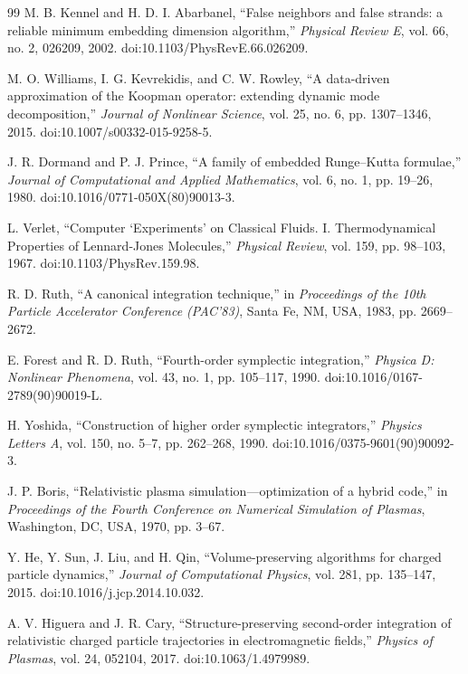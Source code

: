 \documentclass[11pt]{article}
\begin{document}
\begin{thebibliography}{99}
M. B. Kennel and H. D. I. Abarbanel, ``False neighbors and false strands: a reliable minimum embedding dimension algorithm,'' \emph{Physical Review E}, vol. 66, no. 2, 026209, 2002. doi:10.1103/PhysRevE.66.026209.

M. O. Williams, I. G. Kevrekidis, and C. W. Rowley, ``A data-driven approximation of the Koopman operator: extending dynamic mode decomposition,'' \emph{Journal of Nonlinear Science}, vol. 25, no. 6, pp. 1307--1346, 2015. doi:10.1007/s00332-015-9258-5.

J. R. Dormand and P. J. Prince, ``A family of embedded Runge--Kutta formulae,'' \emph{Journal of Computational and Applied Mathematics}, vol. 6, no. 1, pp. 19--26, 1980. doi:10.1016/0771-050X(80)90013-3.

L. Verlet, ``Computer `Experiments' on Classical Fluids. I. Thermodynamical Properties of Lennard-Jones Molecules,'' \emph{Physical Review}, vol. 159, pp. 98--103, 1967. doi:10.1103/PhysRev.159.98.

R. D. Ruth, ``A canonical integration technique,'' in \emph{Proceedings of the 10th Particle Accelerator Conference (PAC'83)}, Santa Fe, NM, USA, 1983, pp. 2669--2672.

E. Forest and R. D. Ruth, ``Fourth-order symplectic integration,'' \emph{Physica D: Nonlinear Phenomena}, vol. 43, no. 1, pp. 105--117, 1990. doi:10.1016/0167-2789(90)90019-L.

H. Yoshida, ``Construction of higher order symplectic integrators,'' \emph{Physics Letters A}, vol. 150, no. 5--7, pp. 262--268, 1990. doi:10.1016/0375-9601(90)90092-3.

J. P. Boris, ``Relativistic plasma simulation---optimization of a hybrid code,'' in \emph{Proceedings of the Fourth Conference on Numerical Simulation of Plasmas}, Washington, DC, USA, 1970, pp. 3--67.

Y. He, Y. Sun, J. Liu, and H. Qin, ``Volume-preserving algorithms for charged particle dynamics,'' \emph{Journal of Computational Physics}, vol. 281, pp. 135--147, 2015. doi:10.1016/j.jcp.2014.10.032.

A. V. Higuera and J. R. Cary, ``Structure-preserving second-order integration of relativistic charged particle trajectories in electromagnetic fields,'' \emph{Physics of Plasmas}, vol. 24, 052104, 2017. doi:10.1063/1.4979989.


\end{thebibliography}
\end{document}
